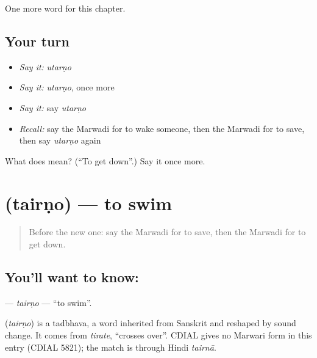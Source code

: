 \begin{grammarlens}[title={What you've built}]
One more word for this chapter.
\end{grammarlens}

\subsection*{Your turn}
\begin{itemize}
\raggedright
  \item \emph{Say it:} \emph{utarṇo}
  \item \emph{Say it:} \emph{utarṇo}, once more
  \item \emph{Say it:} say \emph{utarṇo}
  \item \emph{Recall:} say the Marwadi for to wake someone, then the Marwadi for to save, then say \emph{utarṇo} again
\end{itemize}

\begin{tcolorbox}[breakable,colback=teal!4,colframe=teal!35!black,title={Before you move on}]
What does  mean? (\textquotedblleft{}To get down\textquotedblright{}.) Say it once more.
\end{tcolorbox}
\section[\texorpdfstring{\mw{तैरणो} (tairṇo)}{तैरणो (tairṇo)}]{ (tairṇo) — to swim}

\label{lesson:MW-C108-tairno}



\begin{quote}
Before the new one: say the Marwadi for to save, then the Marwadi for to get down.
\end{quote}

\subsection*{You'll want to know: }
\textbf{} — \emph{tairṇo} — \textquotedblleft{}to swim\textquotedblright{}.

\begin{cousinweb}
\textbf{} (\emph{tairṇo}) is a tadbhava, a word inherited from Sanskrit and reshaped by sound change. It comes from \emph{tirate}, \textquotedblleft{}crosses over\textquotedblright{}. CDIAL gives no Marwari form in this entry (CDIAL 5821); the match is through Hindi \emph{tairnā}.
\end{cousinweb}

